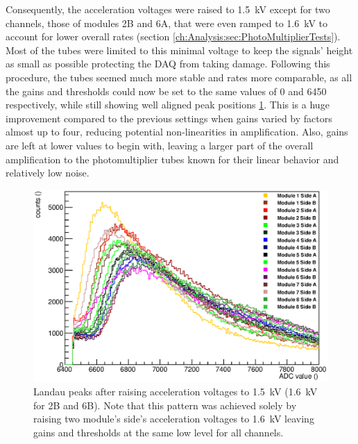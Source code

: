 	Consequently, the acceleration voltages were raised to \SI{1.5}{\kilo\volt} except for two channels, those of modules 2B and 6A, that were even ramped to \SI{1.6}{\kilo\volt} to account for lower overall rates (section \ref{ch:Analysis:sec:PhotoMultiplierTests}).
	Most of the tubes were limited to this minimal voltage to keep the signals' height as small as possible protecting the DAQ from taking damage. Following this procedure, the tubes seemed much more stable and rates more comparable, as all the gains and thresholds could now be set to the same values of \SI{0}{} and \SI{6450}{} respectively, while still showing well aligned peak positions \ref{fig:allPeaksAfter}. This is a huge improvement compared to the previous settings when gains varied by factors almost up to four, reducing potential non-linearities in amplification. Also, gains are left at lower values to begin with, leaving a larger part of the overall amplification to the photomultiplier tubes known for their linear behavior and relatively low noise.
  
	\begin{figure}
		\centering
		\includegraphics[width = 0.9 \textwidth]{graphics/setup/LandauPeaksRun1097_new.eps}
		\caption[Landau peak \SI{1500}{\volt} acceleration voltage]{Landau peaks after raising acceleration voltages to \SI{1.5}{\kilo\volt} (\SI{1.6}{\kilo\volt} for 2B and 6B). Note that this pattern was achieved solely by raising two module's side's acceleration voltages to \SI{1.6}{\kilo\volt} leaving gains and thresholds at the same low level for all channels. }
		\label{fig:allPeaksAfter}
	\end{figure}
	
	

